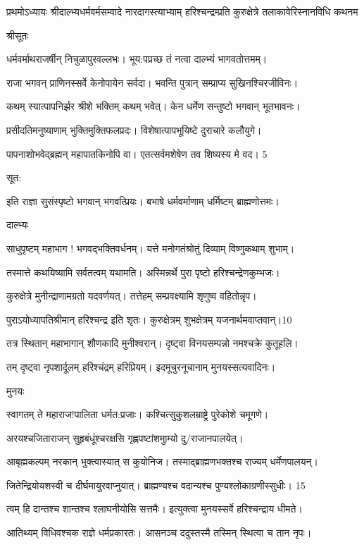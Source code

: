 प्रथमोऽध्यायः
श्रीदाल्भ्यधर्मवर्मसम्वादे नारदागस्त्याभ्याम्
हरिश्चन्द्रम्प्रति कुरुक्षेत्रे
तलाकावेरिस्नानविधि कथनम

श्रीसूतः

धर्मवर्माथराजर्षीन् निचुळापुरवल्लभः।
भूय:पप्रच्छ तं नत्वा दाल्भ्यं भागवतोत्तमम्।

राजा भगवन् प्राणिनस्सर्वे केनोपायेन सर्वदा।
भवन्ति पुत्रान् सम्प्राप्य सुखिनश्चिरजीविनः।

कथम् स्यात्पापनिर्झर श्रीशे भक्तिम् कथम् भवेत्।
केन धर्मेण सन्तुष्टो भगवान् भूतभावनः।

प्रसीदतिमनुष्याणाम् भुक्तिमुक्तिफलप्रदः।
विशेषात्पापभूयिष्टे दुराचारे कलौयुगे।

पापनाशोभवेद्ब्रह्मन् महापातकिनोपि वा।
एतत्सर्वमशेषेण तव शिष्यस्य मे वद। 5

सूत:

इति राज्ञा सुसंस्पृष्टो भगवान् भगवत्प्रियः।
बभाषे धर्मवर्माणाम् धर्मिष्टम् ब्राह्मणोत्तमः।

दाल्भ्यः

साधुपृष्टम् महाभाग ! भगवद्भक्तिवर्धनम्।
यत्ते मनोगतंश्रोतुं दिव्याम् विष्णुकथाम् शुभाम्।

तस्मात्ते कथयिष्यामि सर्वतत्वम् यथामति।
अस्मिन्नर्थे पुरा पृष्टो हरिश्चन्द्रेणकुम्भजः।

कुरुक्षेत्रे मुनीन्द्राणामग्रतो यदवर्णयत्।
तत्तेहम् सम्प्रवक्ष्यामि शृणुष्व वहितोन्नृप।

पुराऽयोध्यापतिश्रीमान् हरिश्चन्द्र इति शृतः।
कुरुक्षेत्रम् शुभक्षेत्रम् यजनार्थमवाप्तवान्।10

तत्र स्थितान् महाभागान् शौणकादि मुनीश्वरान्।
दृष्ट्वा विनयसम्पन्नो नमश्चक्रे कुतूहलि।

तम् दृष्ट्वा नृपशार्दूलम् हरिश्चंद्रम् हरिप्रियम्।
इदमूचुरनूचानाम् मुनयस्सत्यवादिनः।

मुनयः

स्वागतम् ते महाराज!पालिता धर्मत:प्रजाः।
कश्चित्सुकुशलम्राष्ट्रे पुरेकोशे चमूगणे।

अरयश्चजिताराजन् सुहृबंधूंश्चरक्षसि
गृह्णपष्टांशमुाम्यो दु/राजानपालयेत्।

आबृह्मकल्पम् नरकान् भुक्त्वास्यात् स कुयोनिज।
तस्माद्ब्राह्मणभक्तश्च राज्यम् धर्मेणपालयन्।

जितेन्द्रियोयशस्वी च दीर्घमायुरवाप्नुयात्।
ब्राह्मण्यश्च वदान्यश्च पुण्यश्लोकाग्रणीस्सुधीः। 15

त्वम् हि दान्तश्च शान्तश्च श्लाघनीयोसि सत्तमैः।
इत्युक्त्वा मुनयस्सर्वे हरिश्चन्द्राय धीमते।

आतिथ्यम् विधिवश्चक राज्ञे धर्मप्रकारतः।
आसनञ्च ददुस्तस्मै तस्मिन् स्थित्वा च तान नृपः।

